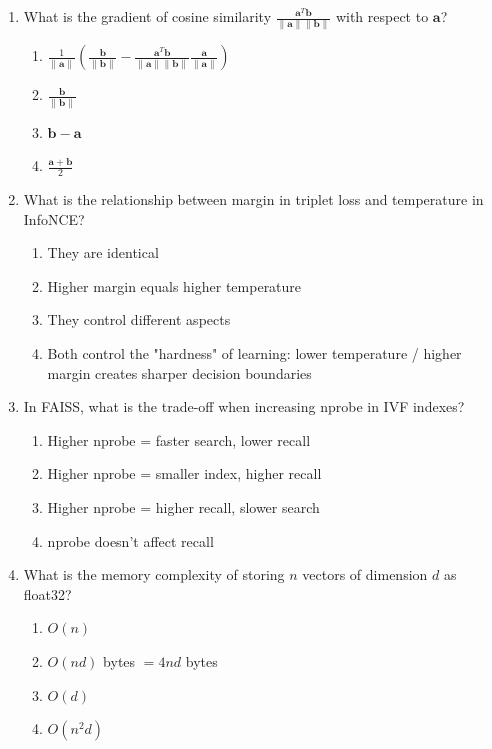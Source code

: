 \documentclass[12pt,a4paper]{article}
\begin{document}
\begin{enumerate}
\item What is the gradient of cosine similarity $\frac{\mathbf{a}^T\mathbf{b}}{\|\mathbf{a}\|\|\mathbf{b}\|}$ with respect to $\mathbf{a}$?
\begin{enumerate}[label=\Alph*)]
    \item $\frac{1}{\|\mathbf{a}\|}\left(\frac{\mathbf{b}}{\|\mathbf{b}\|} - \frac{\mathbf{a}^T\mathbf{b}}{\|\mathbf{a}\|\|\mathbf{b}\|}\frac{\mathbf{a}}{\|\mathbf{a}\|}\right)$
    \item $\frac{\mathbf{b}}{\|\mathbf{b}\|}$
    \item $\mathbf{b} - \mathbf{a}$
    \item $\frac{\mathbf{a} + \mathbf{b}}{2}$
\end{enumerate}

\item What is the relationship between margin in triplet loss and temperature in InfoNCE?
\begin{enumerate}[label=\Alph*)]
    \item They are identical
    \item Higher margin equals higher temperature
    \item They control different aspects
    \item Both control the "hardness" of learning: lower temperature / higher margin creates sharper decision boundaries
\end{enumerate}

\item In FAISS, what is the trade-off when increasing nprobe in IVF indexes?
\begin{enumerate}[label=\Alph*)]
    \item Higher nprobe = faster search, lower recall
    \item Higher nprobe = smaller index, higher recall
    \item Higher nprobe = higher recall, slower search
    \item nprobe doesn't affect recall
\end{enumerate}

\item What is the memory complexity of storing $n$ vectors of dimension $d$ as float32?
\begin{enumerate}[label=\Alph*)]
    \item $O(n)$
    \item $O(nd)$ bytes $= 4nd$ bytes
    \item $O(d)$
    \item $O(n^2d)$
\end{enumerate}


\end{enumerate}
\end{document}
